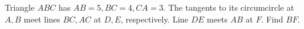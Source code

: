 Triangle $ABC$ has $AB=5,BC=4,CA=3$. The tangents to its circumcircle at $A,B$ meet lines $BC,AC$ at $D,E$, respectively. Line $DE$ meets $AB$ at $F$. Find $BF$.
